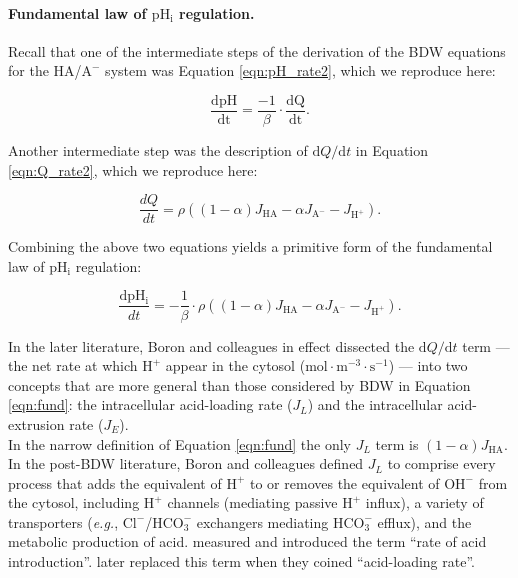 \documentclass[fleqn,10pt]{physiome}
\begin{document}
\paragraph{Fundamental law of $\mathrm{pH_i}$ regulation.} Recall that one of the intermediate steps of the derivation of the BDW equations for the $\mathrm{HA}$/$\mathrm{A^-}$ system was Equation \ref{eqn:pH_rate2}, which we reproduce here:

\begin{equation}
\dfrac{\mathrm{dpH}}{\mathrm{dt}} = \dfrac{-1}{\beta}\cdot \dfrac{\mathrm{dQ}}{\mathrm{dt}}. 
\end{equation}

Another intermediate step was the description of $\mathrm{d}Q/\mathrm{d}t$ in Equation \ref{eqn:Q_rate2}, which we reproduce here:

\begin{equation}
\dfrac{dQ}{dt}=\rho\left((1-\alpha)J_\mathrm{HA}-\alpha J_{\mathrm{A^-}}-J_\mathrm{H^+}\right).
\end{equation}

Combining the above two equations yields a primitive form of the fundamental law of $\mathrm{pH_i}$ regulation:

\begin{equation}
\dfrac{\mathrm{dpH_i}}{dt}=-\dfrac{1}{\beta}\cdot \rho\left((1-\alpha)J_\mathrm{HA}-\alpha J_\mathrm{A^-}-J_\mathrm{H^+}\right).
\label{eqn:fund}
\end{equation}
  
In the later literature, Boron and colleagues in effect dissected the $\mathrm{d}Q/\mathrm{d}t$ term --- the net rate at which $\mathrm{H^+}$ appear in the cytosol ($\mathrm{mol\cdot m^{-3}\cdot s^{-1}}$) --- into two concepts that are more general than those considered by BDW in Equation \ref{eqn:fund}: the intracellular acid-loading rate ($J_L$) and the intracellular acid-extrusion rate ($J_E$).\\

In the narrow definition of Equation \ref{eqn:fund} the only $J_L$ term is $(1-\alpha)J_\mathrm{HA}$. In the post-BDW literature, Boron and colleagues defined $J_L$ to comprise every process that adds the equivalent of $\mathrm{H^+}$ to or removes the equivalent of $\mathrm{OH^-}$ from the cytosol, including $\mathrm{H^+}$ channels (mediating passive $\mathrm{H^+}$ influx), a variety of transporters (\emph{e.g.}, $\mathrm{Cl^-}$/$\mathrm{HCO_3^-}$ exchangers mediating $\mathrm{HCO_3^-}$ efflux), and the metabolic production of acid. \cite{boron1979ph} measured and introduced the term ``rate of acid introduction''. \cite{roos1981intracellular} later replaced this term when they coined ``acid-loading rate''.\\
\end{document}
